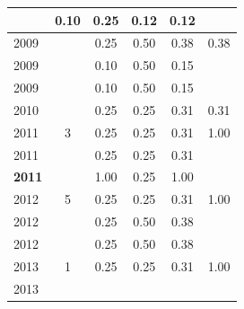 \begin{table}[H]
\begin{tabular}{| l | c | c | c | c | c |}
          &
          0.10
          &
          0.25
          &
          0.12
          &
            {\color{red} 0.12}
          \\
\hline
            2009
          &
          
          &
          0.25
          &
          0.50
          &
          0.38
          &
            {\color{red} 0.38}
          \\
            2009
          &
          
          &
          0.10
          &
          0.50
          &
          0.15
          &
          \\
            2009
          &
          
          &
          0.10
          &
          0.50
          &
          0.15
          &
          \\
\hline
            2010
          &
          
          &
          0.25
          &
          0.25
          &
          0.31
          &
            {\color{red} 0.31}
          \\
\hline
            2011
          &
          3
          &
          0.25
          &
          0.25
          &
          0.31
          &
            {\color{blue} 1.00}
          \\
            2011
          &
          
          &
          0.25
          &
          0.25
          &
          0.31
          &
          \\
            {\bf 2011}
          &
          
          &
          1.00
          &
          0.25
          &
          1.00
          &
          \\
\hline
            2012
          &
          5
          &
          0.25
          &
          0.25
          &
          0.31
          &
            {\color{blue} 1.00}
          \\
            2012
          &
          
          &
          0.25
          &
          0.50
          &
          0.38
          &
          \\
            2012
          &
          
          &
          0.25
          &
          0.50
          &
          0.38
          &
          \\
\hline
            2013
          &
          1
          &
          0.25
          &
          0.25
          &
          0.31
          &
            {\color{blue} 1.00}
          \\
            2013
          &
          

\end{tabular}
\end{table}
